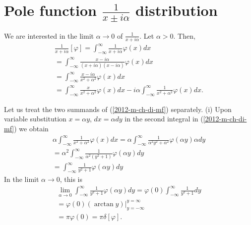\section{Pole function $\frac{1}{x\pm i\alpha}$ distribution}

We are interested in the limit $\alpha  \rightarrow 0$ of $\frac{1}{x+i\alpha}$.
Let  $\alpha >0$. Then,
\begin{equation}
\begin{split}
\frac{1}{x+i\alpha} \left[ \varphi \right]
=
\int_{-\infty}^\infty  \frac{1}{x+i\alpha}  \varphi(x) dx
\\
=
\int_{-\infty}^\infty   \frac{x-i\alpha}{ (x+i\alpha)(x-i\alpha) }   \varphi(x) dx
\\
=
\int_{-\infty}^\infty   \frac{x-i\alpha}{x^2+ \alpha^2}   \varphi(x) dx
\\
=
\int_{-\infty}^\infty   \frac{x}{x^2+ \alpha^2}   \varphi(x) dx
-i\alpha \int_{-\infty}^\infty   \frac{1}{x^2+ \alpha^2}   \varphi(x) dx
.
\end{split}
\label{2012-m-ch-di-mf}
\end{equation}

Let us treat the two summands of (\ref{2012-m-ch-di-mf}) separately.
(i) Upon variable substitution  $x = \alpha y$, $dx =\alpha dy$ in the second integral in (\ref{2012-m-ch-di-mf}) we obtain
\begin{equation}
\begin{split}
\alpha \int_{-\infty}^\infty   \frac{1}{x^2+ \alpha^2}   \varphi(x) dx
=
\alpha \int_{-\infty}^\infty   \frac{1}{\alpha^2y^2+ \alpha^2}   \varphi(\alpha y) \alpha dy
\\
=
\alpha^2 \int_{-\infty}^\infty   \frac{1}{\alpha^2(y^2+ 1)}   \varphi(\alpha y)   dy
\\
=
  \int_{-\infty}^\infty   \frac{1}{  y^2+ 1 }   \varphi(\alpha y)   dy
\end{split}
\end{equation}
In the limit $\alpha  \rightarrow 0$, this is
\begin{equation}
\begin{split}
\lim_{\alpha  \rightarrow 0} \int_{-\infty}^\infty   \frac{1}{  y^2+ 1 }   \varphi(\alpha y)   dy
=
\varphi(0) \int_{-\infty}^\infty   \frac{1}{  y^2+ 1 }       dy
\\
 =
\varphi(0) \left. \left( \arctan y \right) \right|_{y=-\infty}^{y=\infty}
\\
  =
\pi \varphi(0) =
\pi \delta [\varphi ]
.
\end{split}
\end{equation}

